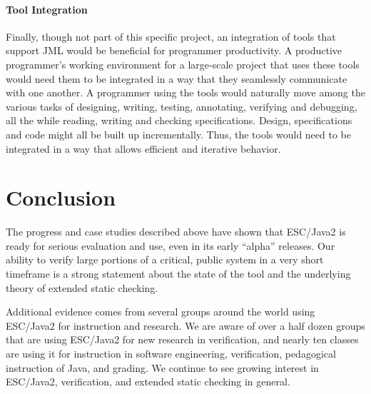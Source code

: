 \documentclass{llncs}
\begin{document}
\paragraph*{Tool Integration} Finally, though not part of this specific
project, an integration of tools that support JML would be beneficial
for programmer productivity.  A productive programmer's working
environment for a large-scale project that uses these tools would need
them to be integrated in a way that they seamlessly communicate
with one another.  A programmer using the tools would naturally move
among the various tasks of designing, writing, testing, annotating,
verifying and debugging, all the while reading, writing and checking
specifications.  Design, specifications and code might all be built up
incrementally.  Thus, the tools would need to be integrated in a way
that allows efficient and iterative behavior.

\section{Conclusion}


The progress and case studies described above
have shown that ESC/Java2 is ready for serious
evaluation and use, even in its early ``alpha'' releases.  Our ability
to verify large portions of a critical, public system in a very short
timeframe is a strong statement about the state of the tool and the underlying
theory of extended static checking.  

Additional evidence comes from several groups around the world using
ESC/Java2 for instruction and research.  We are aware of over a half dozen
groups that are using ESC/Java2 for new research in verification, and
nearly ten classes are using it for instruction in software
engineering, verification, pedagogical instruction of Java, and
grading.  We continue to see growing interest in ESC/Java2, verification,
and extended static checking in general.
\end{document}
